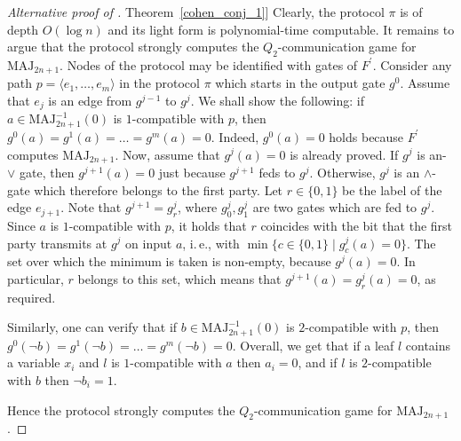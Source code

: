 \documentclass[11pt]{article}
\numberwithin{equation}{section}
\theoremstyle{definition}
\theoremstyle{plain}
\newcommand{\ie}{i.\,e.}
\newcommand{\expref}[2]{\hyperref[#2]{#1~\ref{#2}}}
\def\MAJ{\mathrm{MAJ}}
\begin{document}
\begin{proof}[Alternative proof of \expref{Theorem}{cohen_conj_1}]
Clearly, the protocol $\pi$ is of depth $O(\log n)$ and its light form is polynomial-time computable.  It remains to argue that the protocol strongly computes the $Q_2$-communication game for $\MAJ_{2n + 1}$. Nodes of the protocol may be identified with gates of $F^\prime$. Consider any path $p = \langle e_1, \ldots, e_m \rangle$ in the protocol $\pi$ which starts in the output gate $g^0$. Assume that $e_j$ is an edge from $g^{j - 1}$ to $g^j$. We shall show the following: if $a\in\MAJ_{2n + 1}^{-1}(0)$ is $1$-compatible with $p$, then $g^0(a) = g^1(a) = \ldots = g^m(a) = 0$. Indeed, $g^0(a) = 0$ holds because $F^\prime$ computes $\MAJ_{2n + 1}$. Now, assume that $g^j(a) = 0$ is already proved. If $g^j$ is an-$\lor$ gate, then $g^{j + 1}(a) = 0$ just because $g^{j + 1}$ feds to $g^j$. Otherwise, $g^j$ is an $\land$-gate which therefore belongs to the first party. Let $r\in\{0, 1\}$ be the label of the edge $e_{j + 1}$. Note that $g^{j + 1}  = g^j_r$, where $g^j_0, g^j_1$ are two gates which are fed to $g^j$. Since $a$ is $1$-compatible with $p$, it holds that $r$ coincides with the bit that the first party transmits at $g^j$ on input $a$, \ie, with $\min\{c \in\{0, 1\} \mid g^j_c(a) = 0\}$. The set over which the minimum is taken is non-empty, because $g^j(a) = 0$. In particular, $r$ belongs to this set, which means that $g^{j + 1}(a) = g^j_r(a) = 0$, as required.

Similarly, one can verify that if $b\in\MAJ_{2n + 1}^{-1}(0)$ is $2$-compatible with $p$, then $g^0(\lnot b) = g^1(\lnot b) = \ldots = g^m(\lnot b) = 0$. Overall, we get that if a leaf $l$
%
%
%
%
%
contains a variable $x_i$ and $l$ is $1$-compatible with $a$
then $a_i=0$, and if $l$ is $2$-compatible with $b$ then
$\lnot b_i = 1$.  %

Hence the protocol strongly computes the $Q_2$-communication game 
for $\MAJ_{2n + 1}$.
\end{proof} 
\end{document}
